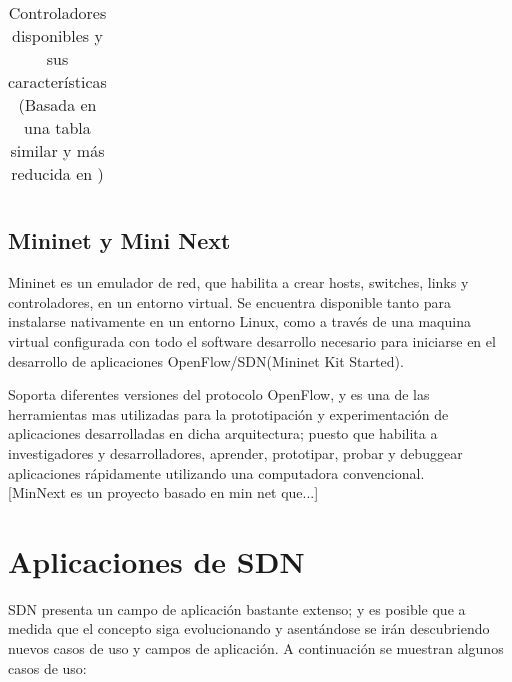 \begin{table}[!htbp]
\begin{tabular}{|l|l|l|p{2cm}|l|p{6cm}|}
\hline   
\end{tabular}
\caption{Controladores disponibles y sus características (Basada en una tabla similar y más reducida en \cite{StateOfArt1})}
\label{table:Controladores}
\end{table}

\subsection{Mininet y Mini Next}
Mininet\cite{Mininet1} es un emulador de red, que habilita a crear hosts, switches, links y controladores, en un entorno virtual. Se encuentra disponible tanto para instalarse nativamente en un entorno Linux, como a través de una maquina virtual configurada con todo el software desarrollo necesario para iniciarse en el desarrollo de aplicaciones OpenFlow/SDN(Mininet Kit Started). 

Soporta diferentes versiones del protocolo OpenFlow, y es una de las herramientas mas utilizadas para la prototipaci\'on y experimentación de aplicaciones desarrolladas en dicha arquitectura; puesto que habilita a investigadores y desarrolladores, aprender, prototipar, probar y debuggear aplicaciones rápidamente utilizando una computadora convencional.\\

[MinNext es un proyecto basado en min net que...]

\section{Aplicaciones de SDN}
SDN presenta un campo de aplicación bastante extenso; y es posible que a medida que el concepto siga evolucionando y asentándose se irán descubriendo nuevos casos de uso y campos de aplicación. A continuación se muestran algunos casos de uso:

